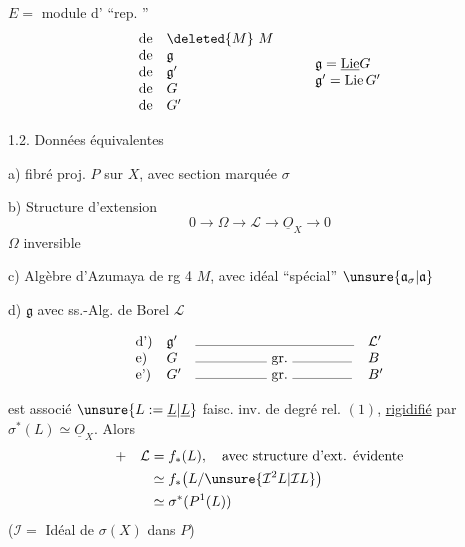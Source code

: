 $E=$ module d' ``rep. ''
\[
\begin{array}{ll}
\text{de}&\deleted{M}\ M\\
\text{de}&\mathfrak g\\
\text{de}&\mathfrak g'\\
\text{de}&G\\
\text{de}&G'
\end{array}
\qquad
\begin{array}{l}
\mathfrak g=\underline{\operatorname{Lie}}G\\
\mathfrak g'=\operatorname{Lie}G'
\end{array}
\]

1.2. Données équivalentes

a) fibré  
proj. $P$ sur $X$, avec section marquée $\sigma$

b) Structure d'extension
\[
0\longrightarrow\Omega\longrightarrow\mathcal L
\longrightarrow\underline O_X\longrightarrow0
\]
$\Omega$ inversible

c) Algèbre d'Azumaya de rg 4 $M$, avec idéal
 ``spécial''
$\unsure{\mathfrak a_\sigma|\mathfrak a}$

d) $\mathfrak g$ avec ss.-Alg. de Borel $\mathcal L$

\[
\begin{array}{llll}
\text{d')}&\mathfrak g'&\rule{4cm}{.3pt}&\mathcal L'\\
\text{e)}&G&\rule{1.8cm}{.3pt}\ \text{gr.}\ \rule{1.5cm}{.3pt}&B\\
\text{e')}&G'&\rule{1.8cm}{.3pt}\ \text{gr.}\ \rule{1.5cm}{.3pt}&B'
\end{array}
\]

 est associé $\unsure{L:=\underline L|\underline L}$
faisc. inv. de degré rel. $(1)$,
\uline{rigidifié} par $\sigma^*(L)\simeq\underline O_X$. Alors
\[
\begin{aligned}
+\quad\mathcal L&=f_*(L),\quad\text{avec structure d'ext. évidente}\\
&\simeq f_*\bigl(L/\unsure{\mathcal I^2L|\mathcal IL}\bigr)\\
&\simeq\sigma^*(P^1(L))
\end{aligned}
\]
($\mathcal I=$ Idéal de $\sigma(X)$ dans $P$)

